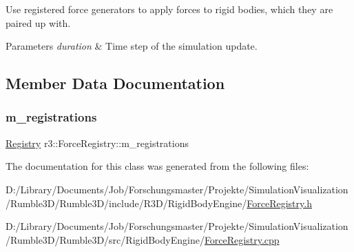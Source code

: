 Use registered force generators to apply forces to rigid bodies, which they are paired up with. 


\begin{DoxyParams}{Parameters}
{\em duration} & Time step of the simulation update. \\
\hline
\end{DoxyParams}


\subsection{Member Data Documentation}
\mbox{\label{classr3_1_1_force_registry_a36847da26301dc4b18e6b6b25fb2fa51}} 
\subsubsection{\texorpdfstring{m\+\_\+registrations}{m\_registrations}}
{\footnotesize\ttfamily \mbox{\hyperlink{classr3_1_1_force_registry_a91449a71b1a33d773ef787ae56ae9b2d}{Registry}} r3\+::\+Force\+Registry\+::m\+\_\+registrations\hspace{0.3cm}{\ttfamily [protected]}}



The documentation for this class was generated from the following files\+:\begin{DoxyCompactItemize}
\item 
D\+:/\+Library/\+Documents/\+Job/\+Forschungsmaster/\+Projekte/\+Simulation\+Visualization/\+Rumble3\+D/\+Rumble3\+D/include/\+R3\+D/\+Rigid\+Body\+Engine/\mbox{\hyperlink{_force_registry_8h}{Force\+Registry.\+h}}\item 
D\+:/\+Library/\+Documents/\+Job/\+Forschungsmaster/\+Projekte/\+Simulation\+Visualization/\+Rumble3\+D/\+Rumble3\+D/src/\+Rigid\+Body\+Engine/\mbox{\hyperlink{_force_registry_8cpp}{Force\+Registry.\+cpp}}\end{DoxyCompactItemize}
